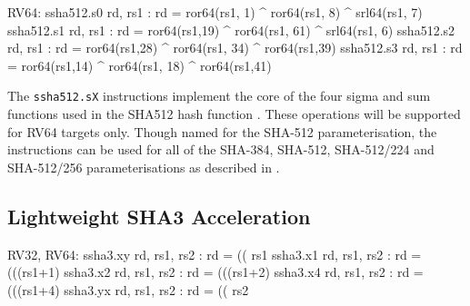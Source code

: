 \begin{cryptoisa}
RV64:
    ssha512.s0 rd, rs1 : rd = ror64(rs1, 1) ^ ror64(rs1,  8) ^ srl64(rs1, 7)
    ssha512.s1 rd, rs1 : rd = ror64(rs1,19) ^ ror64(rs1, 61) ^ srl64(rs1, 6)
    ssha512.s2 rd, rs1 : rd = ror64(rs1,28) ^ ror64(rs1, 34) ^ ror64(rs1,39)
    ssha512.s3 rd, rs1 : rd = ror64(rs1,14) ^ ror64(rs1, 18) ^ ror64(rs1,41)
\end{cryptoisa}

The {\tt ssha512.sX}
instructions implement the core of the four sigma and sum functions used in
the SHA512 hash function \cite[Section 4.1.3]{nist:fips:180:4}.
These operations will be supported for RV64 targets only.
Though named for the SHA-512 parameterisation, the instructions
can be used for all of the SHA-384, SHA-512, SHA-512/224 and SHA-512/256
parameterisations as described in \cite{nist:fips:180:4}.




\subsection{Lightweight SHA3 Acceleration}
\label{sec:scalar:sha3}

\begin{cryptoisa}
RV32, RV64:
    ssha3.xy rd, rs1, rs2 : rd = (( rs1    %
    ssha3.x1 rd, rs1, rs2 : rd = (((rs1+1) %
    ssha3.x2 rd, rs1, rs2 : rd = (((rs1+2) %
    ssha3.x4 rd, rs1, rs2 : rd = (((rs1+4) %
    ssha3.yx rd, rs1, rs2 : rd = (( rs2    %
\end{cryptoisa}

